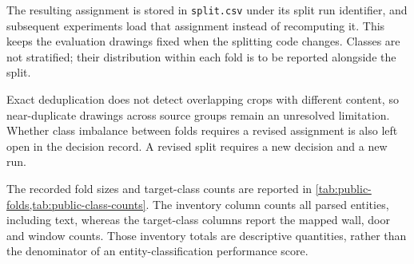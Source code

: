 The resulting assignment is stored in \texttt{split.csv} under its split run
identifier, and subsequent experiments load that assignment instead of recomputing
it.
This keeps the evaluation drawings fixed when the splitting code changes.
Classes are not stratified; their distribution within each fold is to be reported
alongside the split.

Exact deduplication does not detect overlapping crops with different content, so
near-duplicate drawings across source groups remain an unresolved limitation.
Whether class imbalance between folds requires a revised assignment is also left
open in the decision record.
A revised split requires a new decision and a new run.

The recorded fold sizes and target-class counts are reported in
\cref{tab:public-folds,tab:public-class-counts}.
The inventory column counts all parsed entities, including text, whereas the
target-class columns report the mapped wall, door and window counts.
Those inventory totals are descriptive quantities, rather than the denominator
of an entity-classification performance score.

\begin{table}[htbp]
  \centering
  \caption{Frozen public-data fold assignment. Parsed entity totals include text;
  only the geometric entity types specified in the metric protocol are scored.}
  \label{tab:public-folds}
  
\end{table}

\begin{table}[htbp]
  \centering
  \caption{Target-class entity counts in the frozen folds, using the adopted
  release-specific mapping.}
  \label{tab:public-class-counts}
  
\end{table}

